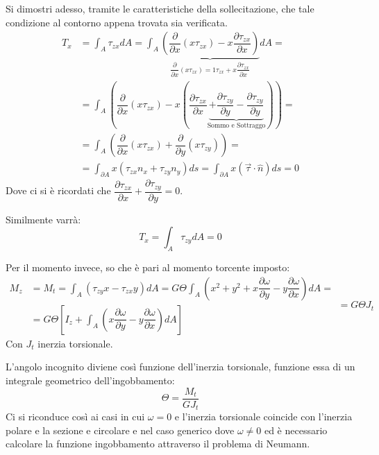 \documentclass{article}
\begin{document}
\begin{adjustwidth}{2in}{}
		Si dimostri adesso, tramite le caratteristiche della sollecitazione, che tale condizione al contorno appena trovata sia verificata. 
		\[ \begin{split} T_x & = \int_A \tau_{zx}dA =  \int_A\underbrace{\left(\dfrac{\partial}{\partial x}(x\tau_{zx}) -x\dfrac{\partial\tau_{zx}}{\partial x}\right)}_\text{$\dfrac{\partial}{\partial x}(x\tau_{zx}) = 1\tau_{zx} +x\dfrac{\partial\tau_{zx}}{\partial x}$}dA = \\
		& = \int_A \left(\dfrac{\partial}{\partial x}(x\tau_{zx}) -x\left(\dfrac{\partial\tau_{zx}}{\partial x} \underbrace{+ \dfrac{\partial\tau_{zy}}{\partial y} - \dfrac{\partial\tau_{zy}}{\partial y}}_\text{Sommo e Sottraggo}\right)\right) = \\
		& = \int_A\left(\dfrac{\partial}{\partial x }(x\tau_{zx}) + \dfrac{\partial}{\partial y}(x\tau_{zy})\right) = \\ 
		& = \int_{\partial A} x(\tau_{zx}n_x + \tau_{zy}n_y)ds = \int_{\partial A} x(\vec{\tau}\cdot \hat{n})ds = 0	\end{split}\]
		Dove ci si è ricordati che $\dfrac{\partial\tau_{zx}}{\partial x} + \dfrac{\partial\tau_{zy}}{\partial y} =0$. \newline 
		
		Similmente varrà: 
		\[ T_x = \int_A \tau_{zy}dA = 0 \]	
		
		Per il momento invece, so che è pari al momento torcente imposto: 
		\[ \begin{split}
			M_z & = M_t = \int_A (\tau_{zy}x -\tau_{zx}y)dA = G\Theta\int_A \left(x^2 + y^2 + x\dfrac{\partial\omega}{\partial y} - y\dfrac{\partial\omega}{\partial x}\right)dA = \\
			& = G\Theta \left[ I_z + \int_A \left(x\dfrac{\partial\omega}{\partial y} - y\dfrac{\partial\omega}{\partial x}\right)dA \right]
		\end{split} = G\Theta J_t\]
		Con $J_t$ inerzia torsionale.
		
		L'angolo incognito diviene così funzione dell'inerzia torsionale, funzione essa di un integrale geometrico dell'ingobbamento: 
		\[ \Theta = \dfrac{M_t}{GJ_t}\]
		Ci si riconduce così ai casi in cui $\omega = 0$ e l'inerzia torsionale coincide con l'inerzia polare e la sezione e circolare e nel caso generico dove $\omega\neq 0$ ed è necessario calcolare la funzione ingobbamento attraverso il problema di Neumann. \newline 
		

\end{adjustwidth}
\end{document}
